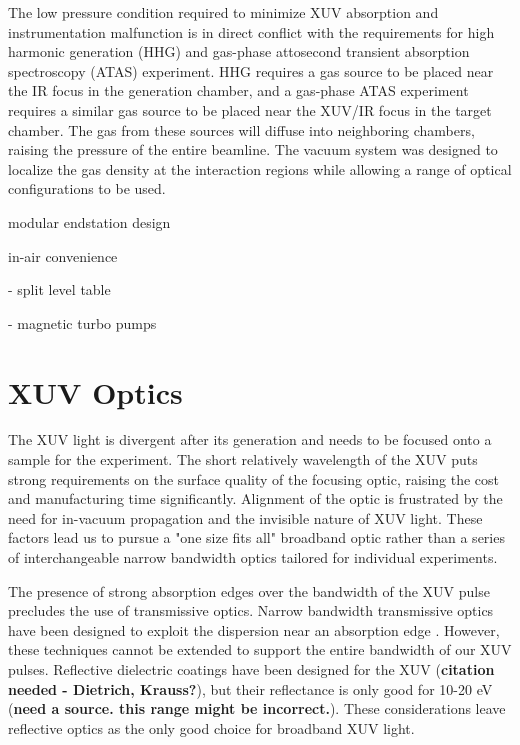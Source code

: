 The low pressure condition required to minimize XUV absorption and instrumentation malfunction is in direct conflict with the requirements for high harmonic generation (HHG) and gas-phase attosecond transient absorption spectroscopy (ATAS) experiment. HHG requires a gas source to be placed near the IR focus in the generation chamber, and a gas-phase ATAS experiment requires a similar gas source to be placed near the XUV/IR focus in the target chamber. The gas from these sources will diffuse into neighboring chambers, raising the pressure of the entire beamline. The vacuum system was designed to localize the gas density at the interaction regions while allowing a range of optical configurations to be used.



modular endstation design

in-air convenience

- split level table

- magnetic turbo pumps


\section{XUV Optics}

The XUV light is divergent after its generation and needs to be focused onto a sample for the experiment. The short relatively wavelength of the XUV puts strong requirements on the surface quality of the focusing optic, raising the cost and manufacturing time significantly. Alignment of the optic is frustrated by the need for in-vacuum propagation and the invisible nature of XUV light. These factors lead us to pursue a "one size fits all" broadband optic rather than a series of interchangeable narrow bandwidth optics tailored for individual experiments.

The presence of strong absorption edges over the bandwidth of the XUV pulse precludes the use of transmissive optics. Narrow bandwidth transmissive optics have been designed to exploit the dispersion near an absorption edge \cite{drescherExtremeultravioletRefractiveOptics2018}. However, these techniques cannot be extended to support the entire bandwidth of our XUV pulses. Reflective dielectric coatings have been designed for the XUV (\textbf{citation needed - Dietrich, Krauss?}), but their reflectance is only good for 10-20 eV (\textbf{need a source. this range might be incorrect.}). These considerations leave reflective optics as the only good choice for broadband XUV light.

